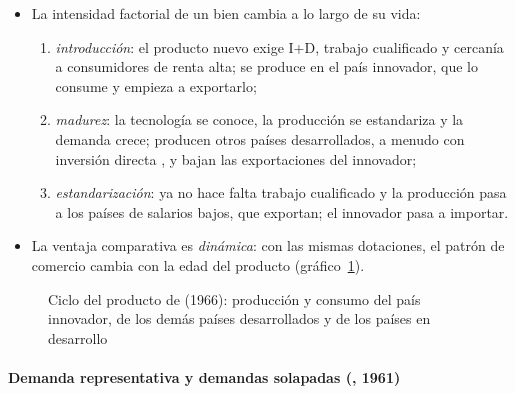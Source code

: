 \documentclass[11pt]{article}
\begin{document}
\begin{itemize}
\item La intensidad factorial de un bien cambia a lo largo de su vida\nocite{Vernon1966International}:
  \begin{enumerate}
  \item \emph{introducción}: el producto nuevo exige I+D, trabajo cualificado y cercanía a consumidores de renta alta; se produce en el país innovador, que lo consume y empieza a exportarlo;
  \item \emph{madurez}: la tecnología se conoce, la producción se estandariza y la demanda crece; producen otros países desarrollados, a menudo con inversión directa , y bajan las exportaciones del innovador;
  \item \emph{estandarización}: ya no hace falta trabajo cualificado y la producción pasa a los países de salarios bajos, que exportan; el innovador pasa a importar.
  \end{enumerate}
\item La ventaja comparativa es \emph{dinámica}: con las mismas dotaciones, el patrón de comercio cambia con la edad del producto (gráfico~\ref{fig:vernon}).
\end{itemize}

\begin{figure}[H]
\centering
\caption{Ciclo del producto de  (1966): producción y consumo del país innovador, de los demás países desarrollados y de los países en desarrollo}\label{fig:vernon}
\end{figure}

\paragraph{Demanda representativa y demandas solapadas (, 1961)}
\end{document}
